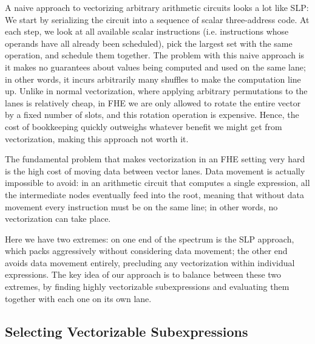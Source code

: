 

A naive approach to vectorizing arbitrary arithmetic circuits looks a lot like SLP: We start by serializing the circuit into a sequence of scalar three-address code.
At each step, we look at all available scalar instructions (i.e. instructions whose operands have all already been scheduled), pick the largest set with the same operation, and schedule them together.
The problem with this naive approach is it makes no guarantees about values being computed and used on the same lane; in other words, it incurs arbitrarily many shuffles to make the computation line up. 
Unlike in normal vectorization, where applying arbitrary permutations to the lanes is relatively cheap, in FHE we are only allowed to rotate the entire vector by a fixed number of slots, and this rotation operation is expensive.
Hence, the cost of bookkeeping quickly outweighs whatever benefit we might get from vectorization, making this approach not worth it.

The fundamental problem that makes vectorization in an FHE setting very hard is the high cost of moving data between vector lanes. 
Data movement is actually impossible to avoid: in an arithmetic circuit that computes a single expression, all the intermediate nodes eventually feed into the root, meaning that without data movement every instruction must be on the same line; in other words, no vectorization can take place.

Here we have two extremes: on one end of the spectrum is the SLP approach, which packs aggressively without considering data movement; the other end avoids data movement entirely, precluding any vectorization within individual expressions.
The key idea of our approach is to balance between these two extremes, by finding highly vectorizable subexpressions and evaluating them together with each one on its own lane.

\subsection{Selecting Vectorizable Subexpressions}  
